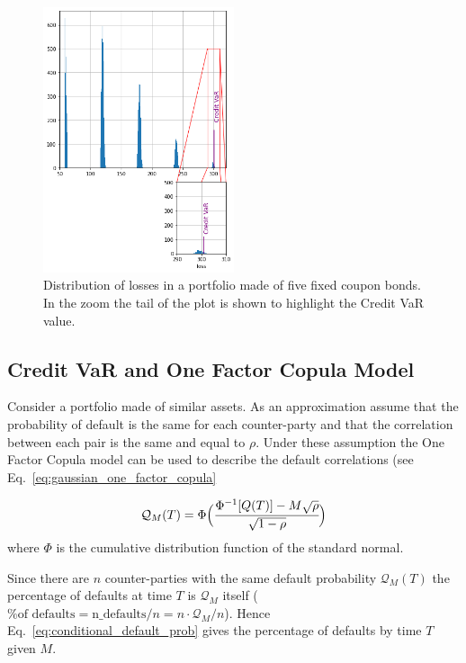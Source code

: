 \begin{figure}[htb]
\centering
\includegraphics[width=0.5\textwidth]{figures/credit_var}
\caption{Distribution of losses in a portfolio made of five fixed coupon bonds. In the zoom the tail of the plot is shown to highlight the Credit VaR value.}
\label{fig:credit_var}
\end{figure}

\subsection{Credit VaR and One Factor Copula Model}
Consider a portfolio made of similar assets. As an approximation assume that the probability of default is the same for each counter-party and that the correlation between each pair is the same and equal to $\rho$. Under these assumption the One Factor Copula model can be used to describe the default correlations (see Eq.~\ref{eq:gaussian_one_factor_copula}

\begin{equation}
\mathcal{Q}_M(T) = \Phi\Big(\cfrac{\Phi^{-1}[Q(T)]-M\sqrt{\rho}}{\sqrt{1-\rho}}\Big)
\label{eq:conditional_default_prob}
\end{equation}
where $\Phi$ is the cumulative distribution function of the standard normal.

Since there are $n$ counter-parties with the same default probability $\mathcal{Q}_M(T)$ the percentage of defaults at time $T$ is $\mathcal{Q}_M$ itself ($\textrm{\% of defaults} = \textrm{n\_defaults}/n = n\cdot \mathcal{Q}_M/n$). Hence Eq.~\ref{eq:conditional_default_prob} gives the percentage of defaults by time $T$ given $M$. 

